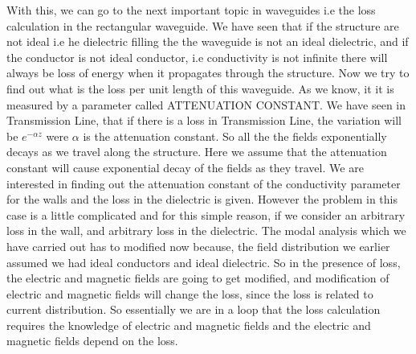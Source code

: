 	With this, we can go to the next important topic in waveguides i.e the loss calculation in the rectangular waveguide. We have seen that if the structure are not ideal i.e he dielectric filling the the waveguide is not an ideal dielectric, and if the conductor is not ideal conductor, i.e conductivity is not infinite there will always be loss of energy when it propagates through the structure.
	Now we try to find out what is the loss per unit length of this waveguide.
	As we know, it it is measured by a parameter called ATTENUATION CONSTANT.
	We have seen in Transmission Line, that if there is a loss in Transmission Line, the variation will be $e^{-\alpha z}$ were $\alpha$ is the attenuation constant. So all the the fields exponentially decays as we travel along the structure. Here we assume that the attenuation constant will cause exponential decay of the fields as they travel. We are interested in finding out the attenuation constant of the conductivity parameter for the walls and the loss in the dielectric is given. However the problem in this case is a little complicated and for this simple reason, if we consider an arbitrary loss in the wall, and arbitrary loss in the dielectric. The modal analysis which we have carried out has to modified now because, the field distribution we earlier assumed we had ideal conductors and ideal dielectric. So in the presence of loss, the electric and magnetic fields are going to get modified, and modification of electric and magnetic fields will change the loss, since the loss is related to current distribution. So essentially we are in a loop that the loss calculation requires the knowledge of electric and  magnetic fields and the electric and magnetic fields depend on the loss.
		
